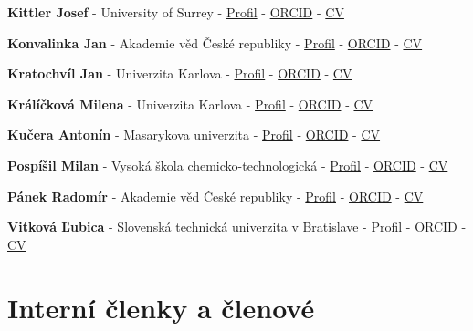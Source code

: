 \documentclass[11pt,a4paper]{article}
\newcommand{\memberComplete}[5]{%
  \item \textbf{#1} - #2 - \href{#3}{Profil} - \href{#4}{ORCID} - \href{#5}{CV}
}
\begin{document}
\begin{memberlist}
\memberComplete{Kittler Josef}
{University of Surrey}
{https://scholar.google.com/citations?user=pk-yb_kAAAAJ}
{https://orcid.org/0000-0002-8110-9205}
{https://drive.google.com/open?id=1z_s8piJLO-WhiVTme4W-0TFqo7JLqiDT}

\memberComplete{Konvalinka Jan}
{Akademie věd České republiky}
{https://www.researchgate.net/profile/Jan-Konvalinka-3}
{https://orcid.org/0000-0003-0695-9266}
{https://drive.google.com/open?id=1mZz9ru4bc149s5tJ_Ai1P6TvHQDn_8ng}

\memberComplete{Kratochvíl Jan}
{Univerzita Karlova}
{https://scholar.google.com/citations?user=AUbareUAAAAJ}
{https://orcid.org/0000-0002-2620-6133}
{https://drive.google.com/open?id=1UWFuNemUh7XEQ7oBfxZ3clMuTlgmiDhC}

\memberComplete{Králíčková Milena}
{Univerzita Karlova}
{http://www.researcherid.com/rid/G-2297-2018}
{https://orcid.org/0000-0003-1907-4774}
{https://drive.google.com/open?id=1rxh6y1Rz94S7s_ZLHiA3bm9tMUxA6RpN}

\memberComplete{Kučera Antonín}
{Masarykova univerzita}
{https://scholar.google.com/citations?user=HxIvytQAAAAJ}
{https://orcid.org/0000-0002-6602-8028}
{https://drive.google.com/open?id=1RcRVrSsvpoBGz2SPklBWYe4wZCs-g0rG}

\memberComplete{Pospíšil Milan}
{Vysoká škola chemicko-technologická}
{https://cs.wikipedia.org/wiki/Milan_Posp\%C3\%AD\%C5\%A1il}
{https://orcid.org/0000-0003-2939-6005}
{https://drive.google.com/open?id=1pYus6_d_Wa4s8FSn7WtfSJaPctXbwwLe}

\memberComplete{Pánek Radomír}
{Akademie věd České republiky}
{https://scholar.google.com/citations?user=fSL1q4MAAAAJ}
{https://orcid.org/0000-0002-6106-3422}
{https://drive.google.com/open?id=1puFzyqjo956tf7DMdA3MdAcWaFijM0Pi}

\memberComplete{Vitková Ľubica}
{Slovenská technická univerzita v Bratislave}
{https://www.researchgate.net/profile/Lubica-Vitkova}
{https://orcid.org/0009-0004-4199-5275}
{https://drive.google.com/open?id=1k5AMyp0rqz7-TDyA0WFN_msC2wYuTm3g}

\end{memberlist}

\section{Interní členky a členové}
\end{document}
